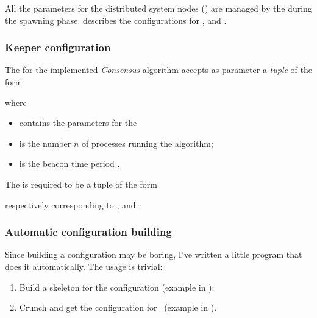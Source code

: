     All the parameters for the distributed system nodes
    () are managed by the
     during the spawning phase.
     describes the configurations for
    ,  and .

\subsubsection{Keeper configuration}
\label{subsub:ConfKeeperParams}

    The  for the implemented \emph{Consensus}
    algorithm accepts as parameter a \emph{tuple} of the form
    \begin{quote}
    \centering
    \end{quote}
    where
    \begin{itemize}
    \item   {} contains the parameters for the
    \item   {} is the number $n$ of processes running the
            algorithm;
    \item   {} is the beacon time period .
    \end{itemize}

    The  is required to be a tuple of the form
    \begin{quote}
    \centering
    \end{quote}
    respectively corresponding to , 
    and .

\subsubsection{Automatic configuration building} \label{subsub:Automagic}

Since building a configuration may be boring, I've written a little
program that does it automatically. The usage is trivial:
\begin{enumerate}
\item   Build a skeleton for the configuration (example in
        );
\item   Crunch and get the configuration for \Erlang\ (example in
        ).
\end{enumerate}

